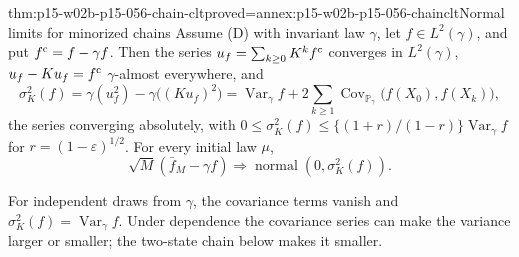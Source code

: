 \begin{hbtheorem}{thm:p15-w02b-p15-056-chain-clt}{proved=annex:p15-w02b-p15-056-chainclt}{Normal limits for minorized chains}
Assume (D) with invariant law \(\gamma\), let \(f\in L^2(\gamma)\), and
put \(f^{\rm c}=f-\gamma f\). Then the series
\(u_f=\sum_{k\geq0}K^kf^{\rm c}\) converges in \(L^2(\gamma)\),
\(u_f-Ku_f=f^{\rm c}\) \(\gamma\)-almost everywhere, and
\[
 \sigma^2_K(f)=\gamma(u_f^2)-\gamma\bigl((Ku_f)^2\bigr)
 =\operatorname{Var}_\gamma f
 +2\sum_{k\geq1}\operatorname{Cov}_{\mathbb P_\gamma}\bigl(f(X_0),f(X_k)\bigr),
\]
the series converging absolutely, with
\(0\leq\sigma^2_K(f)\leq\{(1+r)/(1-r)\}\operatorname{Var}_\gamma f\) for
\(r=(1-\varepsilon)^{1/2}\). For every initial law \(\mu\),
\[
 \sqrt M(\bar f_M-\gamma f)\Rightarrow\operatorname{normal}(0,\sigma^2_K(f)).
\]
\end{hbtheorem}

For independent draws from \(\gamma\), the covariance terms vanish and
\(\sigma^2_K(f)=\operatorname{Var}_\gamma f\). Under dependence the
covariance series can make the variance larger or smaller; the two-state
chain below makes it smaller.

